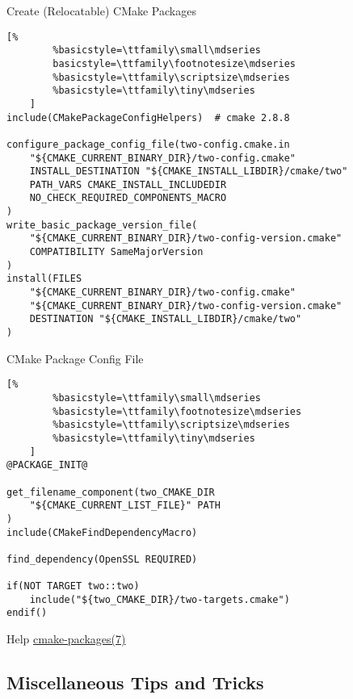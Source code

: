 \documentclass[t]{beamer}
\begin{document}
\begin{frame}[fragile]{Create (Relocatable) CMake Packages}
    \begin{lstlisting}[%
        %basicstyle=\ttfamily\small\mdseries
        basicstyle=\ttfamily\footnotesize\mdseries
        %basicstyle=\ttfamily\scriptsize\mdseries
        %basicstyle=\ttfamily\tiny\mdseries
    ]
include(CMakePackageConfigHelpers)	# cmake 2.8.8

configure_package_config_file(two-config.cmake.in
	"${CMAKE_CURRENT_BINARY_DIR}/two-config.cmake"
	INSTALL_DESTINATION "${CMAKE_INSTALL_LIBDIR}/cmake/two"
	PATH_VARS CMAKE_INSTALL_INCLUDEDIR
	NO_CHECK_REQUIRED_COMPONENTS_MACRO
)
write_basic_package_version_file(
	"${CMAKE_CURRENT_BINARY_DIR}/two-config-version.cmake"
	COMPATIBILITY SameMajorVersion
)
install(FILES
	"${CMAKE_CURRENT_BINARY_DIR}/two-config.cmake"
	"${CMAKE_CURRENT_BINARY_DIR}/two-config-version.cmake"
	DESTINATION "${CMAKE_INSTALL_LIBDIR}/cmake/two"
)
    \end{lstlisting}

\end{frame}

\begin{frame}[fragile]{CMake Package Config File}
    \begin{lstlisting}[%
        %basicstyle=\ttfamily\small\mdseries
        %basicstyle=\ttfamily\footnotesize\mdseries
        %basicstyle=\ttfamily\scriptsize\mdseries
        %basicstyle=\ttfamily\tiny\mdseries
    ]
@PACKAGE_INIT@

get_filename_component(two_CMAKE_DIR
    "${CMAKE_CURRENT_LIST_FILE}" PATH
)
include(CMakeFindDependencyMacro)

find_dependency(OpenSSL REQUIRED)

if(NOT TARGET two::two)
	include("${two_CMAKE_DIR}/two-targets.cmake")
endif()
    \end{lstlisting}

    \begin{block}{Help}
        \href{https://cmake.org/cmake/help/latest/manual/cmake-packages.7.html}{cmake-packages(7)}
    \end{block}
\end{frame}

\subsection{Miscellaneous Tips and Tricks}
\end{document}
